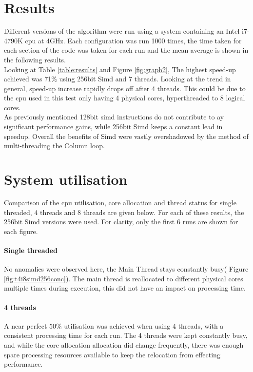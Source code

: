 \documentclass[conference]{acmsiggraph}
\begin{document}
\section{Results}
Different versions of the algorithm were run using a system containing an Intel i7-4790K cpu at 4GHz. Each configuration was run 1000 times, the time taken for each section of the code was taken for each run and the mean average is shown in the following results.\\
Looking at Table \ref{table:results} and Figure \ref{fig:graph2}, The highest speed-up achieved was 71\% using 256bit Simd and 7 threads. 
Looking at the trend in general, speed-up increase rapidly drops off after 4 threads. This could be due to the cpu used in this test only having 4 physical cores, hyperthreaded to 8 logical cores.\\
As previously mentioned 128bit simd instructions do not contribute to ay significant performance gains, while 256bit Simd keeps a constant lead in speedup. Overall the benefits of Simd were vastly overshadowed by the method of multi-threading the Column loop.

\section{System utilisation}
Comparison of the cpu utilisation, core allocation and thread status for single threaded, 4 threads and 8 threads are given below. For each of these results, the 256bit Simd versions were used. For clarity, only the first 6 runs are shown for each figure.

\paragraph{Single threaded}
No anomalies were observed here, the Main Thread stays constantly busy( Figure \ref{fig:t4i8simd256conc}). 
The main thread is reallocated to different physical cores multiple times during execution, this did not have an impact on processing time.

\paragraph{4 threads}
A near perfect 50\% utilisation was achieved when using 4 threads, with a consistent processing time for each run. 
The 4 threads were kept constantly busy, and while the core allocation allocation did change frequently, there was enough spare processing resources available to keep the relocation from effecting performance.
\end{document}

